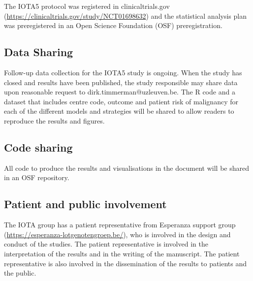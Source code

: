 The \gls{IOTA}5 protocol was registered in clinicaltrials.gov (\url{https://clinicaltrials.gov/study/NCT01698632}) and the statistical analysis plan was preregistered in an Open Science Foundation (\gls{OSF}) preregistration.

\subsection*{Data Sharing}

Follow-up data collection for the IOTA5 study is ongoing. When the study has closed and results have been published, the study responsible may share data upon reasonable request to dirk.timmerman@uzleuven.be. The R code and a dataset that includes centre code, outcome and patient risk of malignancy for each of the different models and strategies will be shared to allow readers to reproduce the results and figures.

\subsection*{Code sharing}
    
All code to produce the results and visualisations in the document will be shared in an \gls{OSF} repository.

\subsection*{Patient and public involvement}

The \gls{IOTA} group has a patient representative from Esperanza support group (\url{https://esperanza-lotgenotengroep.be/}), who is involved in the design and conduct of the studies. The patient representative is involved in the interpretation of the results and in the writing of the manuscript. The patient representative is also involved in the dissemination of the results to patients and the public.
